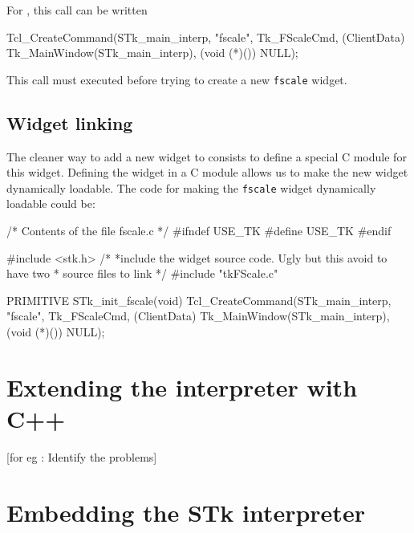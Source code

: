 \documentclass[10pt]{article}
\begin{document}
{For {\stk}, this call can be written 
\begin{Code}
\begin{listing}[200]{2}
Tcl_CreateCommand(STk_main_interp, "fscale", Tk_FScaleCmd, 
                  (ClientData) Tk_MainWindow(STk_main_interp), 
                  (void (*)()) NULL);
\end{listing}
\end{Code}

This call must executed before trying to create a new {\tt fscale}
widget.

\subsection{Widget linking}

The cleaner way to add a new widget to {\stk} consists to define a
special C module for this widget. Defining the widget in a C module
allows us to make the new widget dynamically loadable. The code for 
making the {\tt fscale} widget dynamically loadable could be:

\begin{Code}
\begin{listing}[200]{2}
/* Contents of the file fscale.c */
#ifndef USE_TK
#define USE_TK
#endif
\end{listing}
\end{Code}
\begin{Code}
\begin{listing}[200]{2}
#include <stk.h>
/* 
 *include the widget source code. Ugly but this avoid to have two
 * source files to link
 */
#include "tkFScale.c"
\end{listing}
\end{Code}
\begin{Code}
\begin{listing}[200]{2}
PRIMITIVE STk_init_fscale(void)
{
  Tcl_CreateCommand(STk_main_interp, 
                    "fscale", 
                    Tk_FScaleCmd, 
                    (ClientData) Tk_MainWindow(STk_main_interp), 
                    (void (*)()) NULL);
}
\end{listing}
\end{Code}

\section{Extending the interpreter with C++}

[for eg : Identify the problems]

\section{Embedding the STk interpreter}

}
\end{document}
